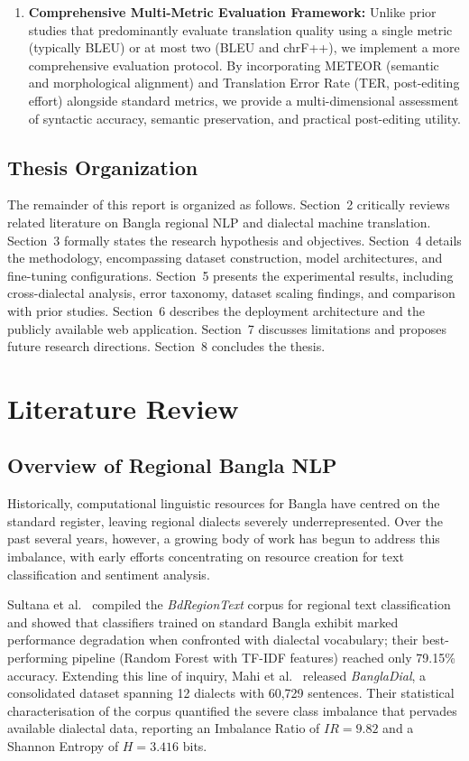 \documentclass[12pt,a4paper]{article}
\begin{document}
\begin{enumerate}[leftmargin=*]
    \item \textbf{Comprehensive Multi-Metric Evaluation Framework:} Unlike prior studies that predominantly evaluate translation quality using a single metric (typically BLEU) or at most two (BLEU and chrF++), we implement a more comprehensive evaluation protocol. By incorporating METEOR (semantic and morphological alignment) and Translation Error Rate (TER, post-editing effort) alongside standard metrics, we provide a multi-dimensional assessment of syntactic accuracy, semantic preservation, and practical post-editing utility.
\end{enumerate}

\subsection{Thesis Organization}
The remainder of this report is organized as follows. Section~2 critically reviews related literature on Bangla regional NLP and dialectal machine translation. Section~3 formally states the research hypothesis and objectives. Section~4 details the methodology, encompassing dataset construction, model architectures, and fine-tuning configurations. Section~5 presents the experimental results, including cross-dialectal analysis, error taxonomy, dataset scaling findings, and comparison with prior studies. Section~6 describes the deployment architecture and the publicly available web application. Section~7 discusses limitations and proposes future research directions. Section~8 concludes the thesis.

\newpage


\section{Literature Review}

\subsection{Overview of Regional Bangla NLP}
Historically, computational linguistic resources for Bangla have centred on the standard register, leaving regional dialects severely underrepresented. Over the past several years, however, a growing body of work has begun to address this imbalance, with early efforts concentrating on resource creation for text classification and sentiment analysis.

Sultana et al.~\cite{sultana2024bdregion} compiled the \textit{BdRegionText} corpus for regional text classification and showed that classifiers trained on standard Bangla exhibit marked performance degradation when confronted with dialectal vocabulary; their best-performing pipeline (Random Forest with TF-IDF features) reached only 79.15\% accuracy. Extending this line of inquiry, Mahi et al.~\cite{mahi2025bangladial} released \textit{BanglaDial}, a consolidated dataset spanning 12 dialects with 60,729 sentences. Their statistical characterisation of the corpus quantified the severe class imbalance that pervades available dialectal data, reporting an Imbalance Ratio of $IR = 9.82$ and a Shannon Entropy of $H = 3.416$ bits.
\end{document}
